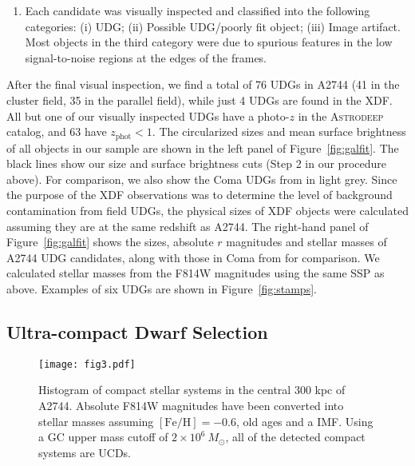\documentclass[iop,tighten,twocolumn,apj]{emulateapj}
\begin{document}
\begin{enumerate}
\item Each candidate was visually inspected and classified into the following
categories: (i) UDG; (ii) Possible UDG/poorly fit object; (iii) Image
artifact. Most objects in the third category were due to spurious features in
the low signal-to-noise regions at the edges of the frames.

\end{enumerate}

After the final visual inspection, we find a total of 76 UDGs in A2744 (41 in
the cluster field, 35 in the parallel field), while just 4 UDGs are found in
the XDF. All but one of our visually inspected UDGs have a photo-$z$ in the
\textsc{Astrodeep} catalog, and 63 have $z_\textrm{phot} < 1$. The
circularized sizes and mean surface brightness of all objects in our sample
are shown in the left panel of Figure~\ref{fig:galfit}. The black lines show
our size and surface brightness cuts (Step 2 in our procedure above).  For
comparison, we also show the Coma UDGs from \cite{yagi2016} in light grey.
Since the purpose of the XDF observations was to determine the level of
background contamination from field UDGs, the physical sizes of XDF objects
were calculated assuming they are at the same redshift as A2744.  The
right-hand panel of Figure~\ref{fig:galfit} shows the sizes, absolute $r$
magnitudes and stellar masses of A2744 UDG candidates, along with those in
Coma from \cite{yagi2016} for comparison. We calculated stellar masses from
the F814W magnitudes using the same SSP as above.  Examples of six UDGs are
shown in Figure~\ref{fig:stamps}. 

\subsection{Ultra-compact Dwarf Selection}

\begin{figure}
	\texttt{[image: fig3.pdf]}
	\caption{
	Histogram of compact stellar systems in the central 300 kpc of A2744.
	Absolute F814W magnitudes have been converted into stellar masses
	assuming $[\mathrm{Fe}/\mathrm{H}] = -0.6$, old ages and a
	\cite{chabrier2003} IMF. Using a GC upper mass cutoff of $2 \times
	10^6~M_{\odot}$, all of the detected compact systems are UCDs.
	\label{fig:UCD}
	}
\end{figure}
\end{document}
